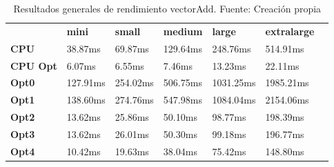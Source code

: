 \begin{table}[H]
    \centering
    \begin{tabular}{lllllll}
    \rowcolor[HTML]{DAE8FC} \ &  \textbf{mini} &  \textbf{small} &  \textbf{medium} &  \textbf{	large} &  \textbf{	extralarge} \\
    \cellcolor[HTML]{DAE8FC} \textbf{CPU} & 38.87ms & 69.87ms & 129.64ms & 	248.76ms & 	514.91ms \\
    \rowcolor[HTML]{EFEFEF} \cellcolor[HTML]{DAE8FC} \textbf{CPU Opt} & 6.07ms & 6.55ms & 7.46ms & 	13.23ms & 	22.11ms \\
    \cellcolor[HTML]{DAE8FC} \textbf{Opt0} & 127.91ms & 254.02ms & 506.75ms & 	1031.25ms & 	1985.21ms \\
    \rowcolor[HTML]{EFEFEF} \cellcolor[HTML]{DAE8FC} \textbf{Opt1} & 138.60ms & 274.76ms & 547.98ms & 	1084.04ms & 	2154.06ms \\
    \cellcolor[HTML]{DAE8FC} \textbf{Opt2} & 13.62ms & 25.86ms & 50.10ms & 	98.77ms & 	198.39ms \\
    \rowcolor[HTML]{EFEFEF} \cellcolor[HTML]{DAE8FC} \textbf{Opt3} & 13.62ms & 26.01ms & 50.30ms & 	99.18ms & 	196.77ms \\
    \cellcolor[HTML]{DAE8FC} \textbf{Opt4} & 10.42ms & 19.63ms & 38.04ms & 	75.42ms & 	148.80ms \\
    \end{tabular}
    \caption[Resultados generales de rendimiento vectorAdd]{{Resultados generales de rendimiento vectorAdd. Fuente: Creación propia}}
    \label{table_global_vectorAdd_PerformanceResults_data}
\end{table}